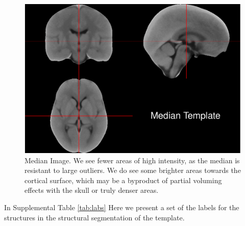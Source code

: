 \documentclass[
]{article}
\begin{document}
\begin{figure}
\centering
\includegraphics{supplement_files/figure-latex/median-1.pdf}
\caption{\label{fig:median}Median Image. We see fewer areas of high intensity, as the median is resistant to large outliers. We do see some brighter areas towards the cortical surface, which may be a byproduct of partial voluming effects with the skull or truly denser areas.}
\end{figure}

In Supplemental Table \ref{tab:labs} Here we present a set of the labels for the structures in the structural segmentation of the template.
\end{document}
